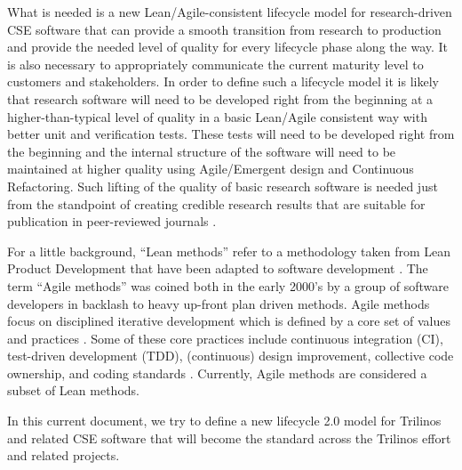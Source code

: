 \documentclass[11pt]{SANDreport}
\begin{document}
What is needed is a new Lean/Agile-consistent lifecycle model for
research-driven CSE software that can provide a smooth transition from
research to production and provide the needed level of quality for
every lifecycle phase along the way.  It is also necessary to
appropriately communicate the current maturity level to customers and
stakeholders.  In order to define such a lifecycle model it is likely
that research software will need to be developed right from the
beginning at a higher-than-typical level of quality in a basic
Lean/Agile consistent way with better unit and verification tests.
These tests will need to be developed right from the beginning and the
internal structure of the software will need to be maintained at
higher quality using Agile/Emergent design and Continuous Refactoring.
Such lifting of the quality of basic research software is needed just
from the standpoint of creating credible research results that are
suitable for publication in peer-reviewed journals
{}\cite{CompSciDemandsNewParadigm05,
ScientistsNightmareFiveRetractions2006}.

For a little background, ``Lean methods'' refer to a methodology taken
from Lean Product Development that have been adapted to software
development {}\cite{ImplementingLeanSoftwareDevelopment}.  The term
``Agile methods'' was coined both in the early 2000's by a group of
software developers in backlash to heavy up-front plan driven methods.
Agile methods focus on disciplined iterative development which is
defined by a core set of values and practices
{}\cite{AgileSoftwareDevelopment, Scrum, XP2}.  Some of these core
practices include continuous integration (CI), test-driven
development (TDD), (continuous) design improvement, collective code
ownership, and coding standards {}\cite{AgileSoftwareDevelopment,
XP2}.  Currently, Agile methods are considered a subset of Lean
methods.

In this current document, we try to define a new lifecycle 2.0 model
for Trilinos and related CSE software that will become the standard
across the Trilinos effort and related projects.
\end{document}
